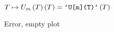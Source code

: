 \documentclass{article}
\begin{document}
\begin{center}
\begin{maplelatex}
{$T\mapsto U_{{m}} \left( T \right)  \left( T \right) =\mbox {{\tt `U[m](T)`}} \left( T \right) $}
\end{maplelatex}\end{center}\begin{maplelatex}
\end{maplelatex}\begin{center}\begin{maplelatex}
\end{maplelatex}\end{center}\begin{maplelatex}
\end{maplelatex}\begin{center}\begin{maplelatex}
\end{maplelatex}\end{center}\begin{maplelatex}
\end{maplelatex}\begin{Maple Error}{Error, empty plot}\end{Maple Error}
\begin{center}\begin{maplelatex}
\end{maplelatex}\end{center}\begin{maplelatex}
\end{maplelatex}
\end{document}
